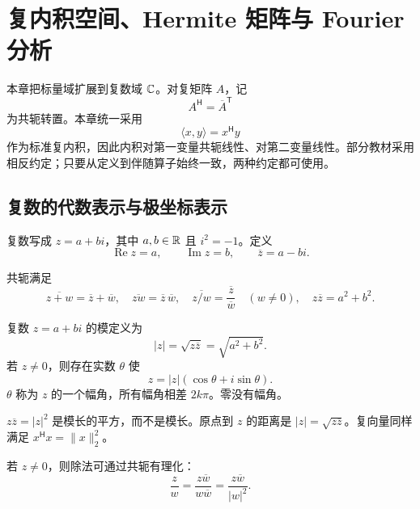 %
%

\chapter{复内积空间、Hermite 矩阵与 Fourier 分析}

本章把标量域扩展到复数域 $\mathbb{C}$。对复矩阵 $A$，记
\[
A^{\mathsf H}=\overline A^{\mathsf T}
\]
为共轭转置。本章统一采用
\[
\langle x,y\rangle=x^{\mathsf H}y
\]
作为标准复内积，因此内积对第一变量共轭线性、对第二变量线性。部分教材采用相反约定；只要从定义到伴随算子始终一致，两种约定都可使用。

\section{复数的代数表示与极坐标表示}

\begin{definition}[复数、实部与虚部]
复数写成 $z=a+bi$，其中 $a,b\in\mathbb{R}$ 且 $i^2=-1$。定义
\[
\operatorname{Re}z=a,
\qquad
\operatorname{Im}z=b,
\qquad
\overline z=a-bi.
\]
\end{definition}

共轭满足
\[
\overline{z+w}=\overline z+\overline w,
\quad
\overline{zw}=\overline z\,\overline w,
\quad
\overline{z/w}=\frac{\overline z}{\overline w}\quad(w\ne0),
\quad
z\overline z=a^2+b^2.
\]

\begin{definition}[模与幅角]
复数 $z=a+bi$ 的模定义为
\[
|z|=\sqrt{z\overline z}=\sqrt{a^2+b^2}.
\]
若 $z\ne0$，则存在实数 $\theta$ 使
\[
z=|z|(\cos\theta+i\sin\theta).
\]
$\theta$ 称为 $z$ 的一个幅角，所有幅角相差 $2k\pi$。零没有幅角。
\end{definition}

\begin{pitfall}
$z\overline z=|z|^2$ 是模长的平方，而不是模长。原点到 $z$ 的距离是
$|z|=\sqrt{z\overline z}$。复向量同样满足 $x^{\mathsf H}x=\lVert x\rVert_2^2$。
\end{pitfall}

若 $z\ne0$，则除法可通过共轭有理化：
\[
\frac zw=\frac{z\overline w}{w\overline w}
=\frac{z\overline w}{|w|^2}.
\]


